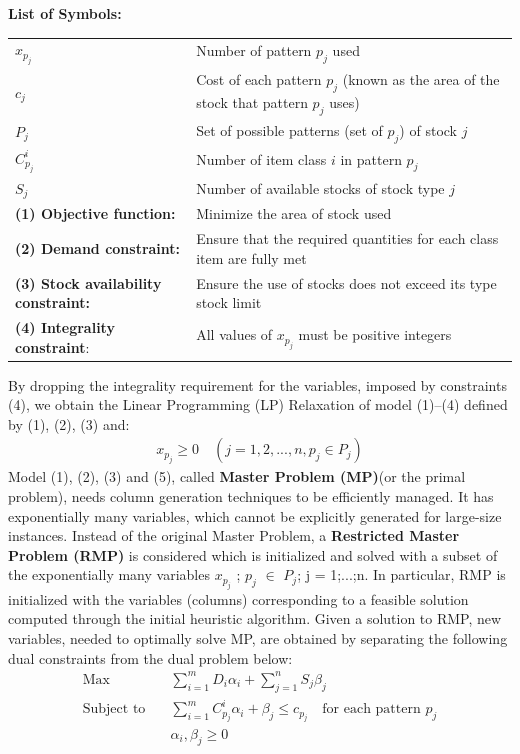 \documentclass[a4paper]{article}
\begin{document}
\textbf{List of Symbols:}
\begin{center}
\begin{tabularx}{0.85\textwidth}{@{} l X @{}}
    \textbf{$x_{p_j}$} & Number of pattern \(p_j\) used \\
    \addlinespace[0.2em]
    \textbf{$c_j$} & Cost of each pattern \(p_j\) (known as the area of the stock that pattern \(p_j\) uses) \\
    \addlinespace[0.2em]
    \textbf{$P_j$} & Set of possible patterns (set of \(p_j\)) of stock \(j\) \\
    \addlinespace[0.2em]
    \textbf{$C_{p_j}^i$} & Number of item class \(i\) in pattern \(p_j\) \\
    \addlinespace[0.2em]
    \textbf{$S_j$} & Number of available stocks of stock type \(j\) \\ 
    \addlinespace[0.5em]
    \textbf{(1) Objective function:} & Minimize the area of stock used \\
    \addlinespace[0.2em]
    \textbf{(2) Demand constraint:} & Ensure that the required quantities for each class item are fully met \\
    \addlinespace[0.2em]
    \textbf{(3) Stock availability constraint:} & Ensure the use of stocks does not exceed its type stock limit \\
    \addlinespace[0.2em]
    \textbf{(4) Integrality constraint}: & All values of \(x_{p_j}\) must be positive integers \\
\end{tabularx}
\end{center}

\FloatBarrier

\noindent By dropping the integrality requirement for the variables, imposed by constraints (4), we obtain the Linear Programming (LP) Relaxation of model (1)–(4) defined by (1), (2), (3) and:
\begin{align}
    x_{p_j} \ge 0 \quad ( j = 1, 2, ..., n, p_j \in P_j )
\end{align}
 Model (1), (2), (3) and (5), called \textbf{Master Problem (MP)}(or the primal problem), needs column generation techniques to be efficiently managed. It has exponentially many variables, which cannot be explicitly generated for large-size instances. Instead of the original Master Problem, a \textbf{Restricted Master Problem (RMP)} is considered which is initialized and solved with a subset of the exponentially many variables \(x_{p_j}\) ; \(p_j\) \( \in \) \(P_j\); j = 1;...;n. In particular, RMP is initialized with the variables (columns) corresponding to a feasible solution computed through the initial heuristic algorithm. Given a solution to RMP, new variables, needed to optimally solve MP, are obtained by separating the following dual constraints from the dual problem below:
\begin{align}
\text{Max} \quad & \sum_{i=1}^{m} D_i \alpha_i + \sum_{j=1}^{n} S_j \beta_j \\
\text{Subject to} \quad & \sum_{i=1}^{m} C_{p_j}^i \alpha_i + \beta_j \le c_{p_j} \quad \text{for each pattern } p_j \\
& \alpha_i, \beta_j \ge 0
\end{align}
\end{document}
